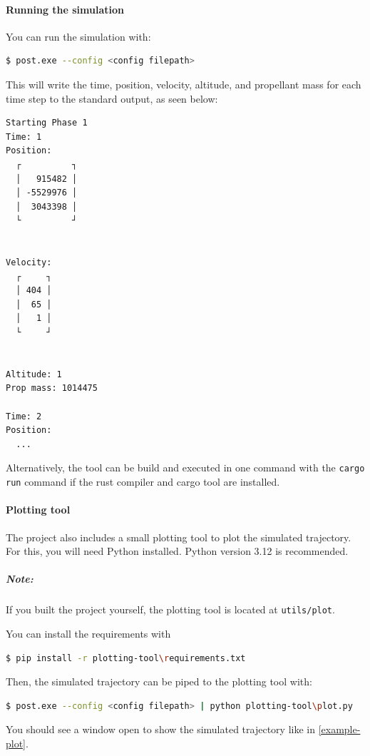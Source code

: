 \paragraph{Running the simulation}

You can run the simulation with:
\begin{lstlisting}[language=sh]
 $ post.exe --config <config filepath>
\end{lstlisting}

This will write the time, position, velocity, altitude, and propellant mass
for each time step to the standard output, as seen below:
\begin{verbmd}
  \begin{verbatim}
Starting Phase 1
Time: 1
Position:
  ┌          ┐
  │   915482 │
  │ -5529976 │
  │  3043398 │
  └          ┘


Velocity:
  ┌     ┐
  │ 404 │
  │  65 │
  │   1 │
  └     ┘


Altitude: 1
Prop mass: 1014475

Time: 2
Position:
  ...
 \end{verbatim}
\end{verbmd}

Alternatively, the tool can be build and executed in one command with the \lstinline{cargo run}
command if the rust compiler and cargo tool are installed.

\paragraph{Plotting tool}

The project also includes a small plotting tool to plot the simulated trajectory. For this, you
will need Python installed. Python version 3.12 is recommended.

\subparagraph{Note:} If you built the project yourself, the plotting tool is located at \lstinline{utils/plot}.

You can install the requirements with
\begin{lstlisting}[language=sh]
 $ pip install -r plotting-tool\requirements.txt
\end{lstlisting}

Then, the simulated trajectory can be piped to the plotting tool with:
\begin{lstlisting}[language=sh]
 $ post.exe --config <config filepath> | python plotting-tool\plot.py
\end{lstlisting}

You should see a window open to show the simulated trajectory like in \cref{example-plot}.

